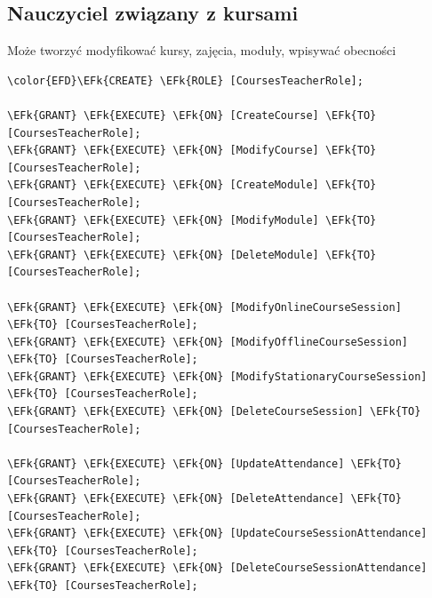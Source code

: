\documentclass[11pt]{article}
\newcommand{\EFk}[1]{\textcolor{EFk}{\textbf{#1}}} %
\begin{document}
\subsection{Nauczyciel związany z kursami}
\label{sec:orgc7e3f09}
Może tworzyć modyfikować kursy, zajęcia, moduły, wpisywać obecności
\begin{Code}
\begin{Verbatim}
\color{EFD}\EFk{CREATE} \EFk{ROLE} [CoursesTeacherRole];

\EFk{GRANT} \EFk{EXECUTE} \EFk{ON} [CreateCourse] \EFk{TO} [CoursesTeacherRole];
\EFk{GRANT} \EFk{EXECUTE} \EFk{ON} [ModifyCourse] \EFk{TO} [CoursesTeacherRole];
\EFk{GRANT} \EFk{EXECUTE} \EFk{ON} [CreateModule] \EFk{TO} [CoursesTeacherRole];
\EFk{GRANT} \EFk{EXECUTE} \EFk{ON} [ModifyModule] \EFk{TO} [CoursesTeacherRole];
\EFk{GRANT} \EFk{EXECUTE} \EFk{ON} [DeleteModule] \EFk{TO} [CoursesTeacherRole];

\EFk{GRANT} \EFk{EXECUTE} \EFk{ON} [ModifyOnlineCourseSession] \EFk{TO} [CoursesTeacherRole];
\EFk{GRANT} \EFk{EXECUTE} \EFk{ON} [ModifyOfflineCourseSession] \EFk{TO} [CoursesTeacherRole];
\EFk{GRANT} \EFk{EXECUTE} \EFk{ON} [ModifyStationaryCourseSession] \EFk{TO} [CoursesTeacherRole];
\EFk{GRANT} \EFk{EXECUTE} \EFk{ON} [DeleteCourseSession] \EFk{TO} [CoursesTeacherRole];

\EFk{GRANT} \EFk{EXECUTE} \EFk{ON} [UpdateAttendance] \EFk{TO} [CoursesTeacherRole];
\EFk{GRANT} \EFk{EXECUTE} \EFk{ON} [DeleteAttendance] \EFk{TO} [CoursesTeacherRole];
\EFk{GRANT} \EFk{EXECUTE} \EFk{ON} [UpdateCourseSessionAttendance] \EFk{TO} [CoursesTeacherRole];
\EFk{GRANT} \EFk{EXECUTE} \EFk{ON} [DeleteCourseSessionAttendance] \EFk{TO} [CoursesTeacherRole];
\end{Verbatim}
\end{Code}
\end{document}
